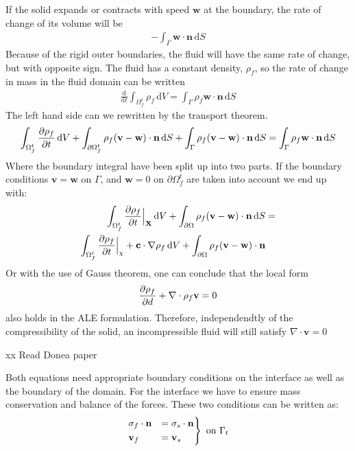 If the solid expands or contracts with speed $\mathbf{w}$ at the boundary, the rate of change of its volume will be 
\begin{align}
-\int_\Gamma \mathbf{w} \cdot \mathbf{n} \,\mathrm{d}S
\end{align}
Because of the rigid outer boundaries, the fluid will have the same rate of change, but with opposite sign. The fluid has a constant density, $\rho_f$, so the rate of change in mass in the fluid domain can be written 
\begin{align}
\frac{\mathrm{d}}{\mathrm{d}t}\int_{\Omega_f^t} \rho_f \, \mathrm{d}V = \int_\Gamma \rho_f \mathbf{w} \cdot \mathbf{n} \,\mathrm{d}S
\end{align}
The left hand side can we rewritten by the transport theorem.
\begin{align}
\int_{\Omega_f^t} \frac{\partial \rho_f}{\partial t} \, \mathrm{d}V + \int_{\partial \Omega_f^t} \rho_f (\mathbf{v}-\mathbf{w}) \cdot \mathbf{n} \, \mathrm{d}S + \int_{\Gamma} \rho_f (\mathbf{v}-\mathbf{w}) \cdot \mathbf{n} \, \mathrm{d}S = \int_\Gamma \rho_f \mathbf{w} \cdot \mathbf{n} \,\mathrm{d}S
\end{align}
Where the boundary integral have been split up into two parts. If the boundary conditions $\mathbf{v}=\mathbf{w}$ on $\Gamma$, and $\mathbf{w} = 0$ on $\partial \Omega_f^t$ are taken into account we end up with: 
\begin{align}
\int_{\Omega_f^t} \frac{\partial \rho_f}{\partial t}\Big{|}_\mathbf{X} \, \mathrm{d}V + \int_{\partial \Omega} \rho_f (\mathbf{v-w}) \cdot \mathbf{n} \, \mathrm{d}S &  = \\
\int_{\Omega_f^t} \frac{\partial \rho_f}{\partial t}\Big{|}_\mathbf{\chi} + \mathbf{c} \cdot \nabla \rho_f \, \mathrm{d}V + \int_{\partial \Omega} \rho_f (\mathbf{v-w}) \cdot \mathbf{n}
\end{align}
Or with the use of Gauss theorem, one can conclude that the local form
\begin{align}
\frac{\partial \rho_f}{\partial d} + \nabla \cdot \rho_f \mathbf{v} = 0
\end{align}
also holds in the ALE formulation. Therefore, independendtly of the compressibility of the solid, an incompressible fluid will still satisfy $\nabla \cdot \mathbf{v} = 0$


xx Read Donea paper \cite{Done04}

Both equations need appropriate boundary conditions on the interface as well as the boundary of the domain. For the interface we have to ensure mass conservation and balance of the forces. These two conditions can be written as:
\begin{align}
\begin{rcases}
\sigma_f \cdot \mathbf{n} & =  \sigma_s \cdot \mathbf{n} \\
\mathbf{v}_f & = \mathbf{v}_s
\end{rcases}
\text{ on } \Gamma_t
\end{align}








